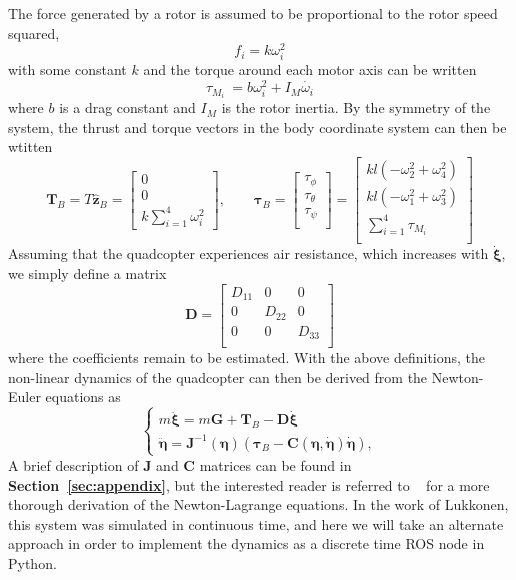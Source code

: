 \documentclass{article}
\begin{document}
The force generated by a rotor is assumed to be proportional to the rotor speed squared,
\begin{equation}
f_i = k\omega_i^2
\end{equation}
with some constant $k$ and the torque around each motor axis can be written
\begin{equation}
\tau_{M_i}\ = b\omega_i^2+I_M\dot{\omega_i}
\end{equation}
where $b$ is a drag constant and $I_M$ is the rotor inertia. By the symmetry of the system, the thrust and torque vectors in the body coordinate system can then be wtitten
\begin{equation}\label{eq:torque}
\mathbf{T}_{B} =
T \hat{\mathbf{z}}_B= 
\begin{bmatrix}
0\\
0\\
 k\sum\limits_{i = 1}^4\omega_i^2
\end{bmatrix}
, \qquad
\boldsymbol{\tau}_B = 
\begin{bmatrix}
\tau_{\phi}\\
\tau_{\theta}\\
\tau_{\psi}\\
\end{bmatrix}
=
\begin{bmatrix}
kl(-\omega_2^2 + \omega_4^2)\\
kl(-\omega_1^2 + \omega_3^2)\\
\sum\limits_{i = 1}^4\tau_{M_i}\\
\end{bmatrix}
\end{equation}
Assuming that the quadcopter experiences air resistance, which increases with $\dot{\boldsymbol{\xi}}$, we simply define a matrix
\begin{equation}
\mathbf{D} =
\begin{bmatrix} D_{11} & 0 & 0\\ 0 & D_{22} & 0\\ 0 & 0 & D_{33}\\\end{bmatrix}
\end{equation}
where the coefficients remain to be estimated. With the above definitions, the non-linear dynamics of the quadcopter can then be derived from the Newton-Euler equations as
\begin{equation}
\begin{cases}
 m\ddot{\boldsymbol{\xi}} = m\mathbf{G} + \mathbf{T}_{B}-\mathbf{D}\dot{\boldsymbol{\xi}}\\
\ddot{\boldsymbol{\eta}}=\mathbf{J}^{-1}(\boldsymbol{\eta})(\boldsymbol{\tau}_B-\mathbf{C}(\boldsymbol{\eta},\dot{\boldsymbol{\eta}})\dot{\boldsymbol{\eta}}),
\end{cases}
\end{equation}
A brief description of $\mathbf{J}$ and $\mathbf{C}$ matrices can be found in \textbf{Section~\ref{sec:appendix}}, but the interested reader is referred to ~\cite{luukkonen2011modelling} for a more thorough derivation of the Newton-Lagrange equations. In the work of Lukkonen, this system was simulated in continuous time, and here we will take an alternate approach in order to implement the dynamics as a discrete time ROS node in Python.
\end{document}
